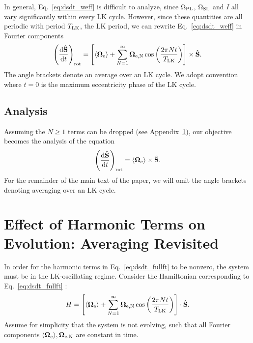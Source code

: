 \documentclass[
        fleqn,
        usenatbib,
    ]{mnras}
\newcommand*{\rd}[2]{\frac{\mathrm{d}#1}{\mathrm{d}#2}}
\newcommand*{\ev}[1]{\langle#1\rangle}
\newcommand*{\bm}[1]{\boldsymbol{\mathbf{#1}}}
\newcommand*{\uv}[1]{\hat{\bm{#1}}}
\newcommand*{\p}[1]{\left(#1\right)}
\newcommand*{\s}[1]{\left[#1\right]}
\begin{document}
In general, Eq.~\eqref{eq:dsdt_weff} is difficult to analyze, since $\Omega_{\rm
PL}$, $\Omega_{\rm SL}$ and $I$ all vary significantly within every LK cycle.
However, since these quantities are all periodic with period $T_{\rm LK}$, the
LK period, we can rewrite Eq.~\eqref{eq:dsdt_weff} in Fourier components
\begin{equation}
    \p{\rd{\uv{S}}{t}}_{\rm rot}
        = \s{\ev{\bm{\Omega}_{\rm e}} + \sum\limits_{N = 1}^\infty
            \bm{\Omega}_{\rm e, N}\cos \p{\frac{2\pi N t}{T_{\rm LK}}}}
            \times \uv{S}.\label{eq:dsdt_fullft}
\end{equation}
The angle brackets denote an average over an LK cycle. We adopt convention where
$t = 0$ is the maximum eccentricity phase of the LK cycle.

\subsection{Analysis}

Assuming the $N \geq 1$ terms can be dropped (see Appendix~\ref{s:harmonic}),
our objective becomes the analysis of the equation
\begin{equation}
    \p{\rd{\uv{S}}{t}}_{\rm rot}
        = \ev{\bm{\Omega}_{\rm e}} \times \uv{S}.\label{eq:dsdt_0only}
\end{equation}
For the remainder of the main text of the paper, we will omit the angle brackets
denoting averaging over an LK cycle.




\clearpage
\onecolumn
\appendix

\section{Effect of Harmonic Terms on Evolution: Averaging Revisited
}\label{s:harmonic}

In order for the harmonic terms in Eq.~\eqref{eq:dsdt_fullft} to be nonzero, the
system must be in the LK-oscillating regime. Consider the Hamiltonian
corresponding to Eq.~\eqref{eq:dsdt_fullft} \citep[see
e.g.][]{kinoshita,storch}:
\begin{equation}
    H = \s{\ev{\bm{\Omega}_{\rm e}} + \sum\limits_{N = 1}^\infty
            \bm{\Omega}_{\rm e, N}\cos \p{\frac{2\pi N t}{T_{\rm LK}}}}
            \cdot \uv{S}.
\end{equation}
Assume for simplicity that the system is not evolving, such that all Fourier
components $\ev{\bm{\Omega}_{\rm e}}, \bm{\Omega}_{\rm e, N}$ are constant in
time.
\end{document}
